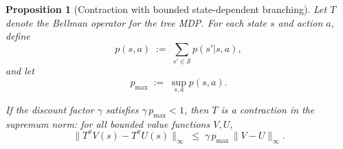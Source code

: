 \documentclass[10pt,a4paper]{amsart}
\newtheorem{proposition}{Proposition}
\begin{document}
\begin{proposition}[Contraction with bounded state-dependent branching]
\label{prop:state_dependent_contraction}
Let $T$ denote the Bellman operator for the tree MDP.
For each state $s$ and action $a$, define
\begin{equation}
p(s,a) \;:=\; \sum_{s' \in \mathcal{S}}p(s'|s, a), %
\end{equation}
and let
\begin{equation}
p_{\max} \;:=\; \sup_{s,a} p(s,a).
\end{equation}

If the discount factor $\gamma$ satisfies $\gamma\, p_{\max} < 1$, then $T$ is a contraction in the supremum norm: for all bounded value functions $V,U$,
\begin{equation}\label{eq:contraction_bounded}
\|T^{\pi}V(s) - T^{\pi}U(s)\|_\infty \;\le\; \gamma\, p_{\max}\, \|V-U\|_\infty.
\end{equation}
\end{proposition}
\end{document}
